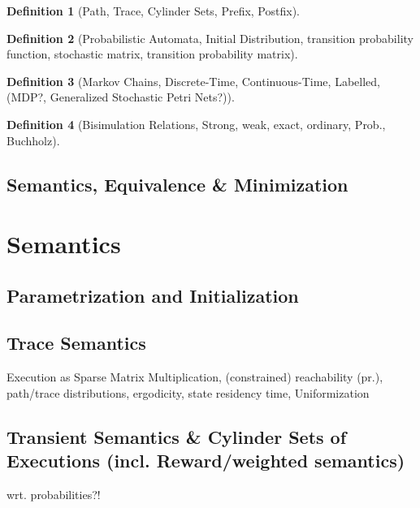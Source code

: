 \documentclass{article} %
\newtheorem{definition}{Definition}[section]
\begin{document}
        \begin{definition}[Path, Trace, Cylinder Sets, Prefix, Postfix]
            
        \end{definition}
    
        \begin{definition}[Probabilistic Automata, Initial Distribution, transition probability function, stochastic matrix, transition probability matrix]
            
        \end{definition}
        
        \begin{definition}[Markov Chains, Discrete-Time, Continuous-Time, Labelled, (MDP?, Generalized Stochastic Petri Nets?)]
            
        \end{definition}
        
        \begin{definition}[Bisimulation Relations, Strong, weak, exact, ordinary, Prob., Buchholz]
            
        \end{definition}
        
        

\subsection{Semantics, Equivalence \& Minimization}\label{complex}
\section{Semantics}
        \subsection{Parametrization and Initialization}
    
        \subsection{Trace Semantics}
            Execution as Sparse Matrix Multiplication, 
            (constrained) reachability (pr.), path/trace distributions,
            ergodicity, state residency time, Uniformization
            
        
        
        \subsection{Transient Semantics \& Cylinder Sets of Executions (incl. Reward/weighted semantics)}
        wrt. probabilities?!
            
\end{document}
